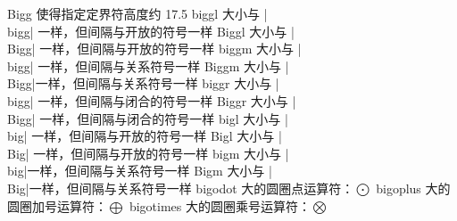 \capcs Bigg {使得指定定界符高度约 17.5\pt}{}{}
\capcs biggl {大小与 |\\bigg| 一样，但间隔与开放的符号一样}{}{}%
\capcs Biggl {大小与 |\\Bigg| 一样，但间隔与开放的符号一样}{}{}%
\capcs biggm {大小与 |\\bigg| 一样，但间隔与关系符号一样}{}{}%
\capcs Biggm {大小与 |\\Bigg|一样，但间隔与关系符号一样}{}{}%
\capcs biggr {大小与 |\\bigg| 一样，但间隔与闭合的符号一样}{}{}%
\capcs Biggr {大小与 |\\Bigg| 一样，但间隔与闭合的符号一样}{}{}%
\capcs bigl {大小与 |\\big| 一样，但间隔与开放的符号一样}{}{}%
\capcs Bigl {大小与 |\\Big| 一样，但间隔与开放的符号一样}{}{}%
\capcs bigm {大小与 |\\big|一样，但间隔与关系符号一样}{}{}%
\capcs Bigm {大小与 |\\Big|一样，但间隔与关系符号一样}{}{}%
\capcs bigodot {大的圆圈点运算符：$\bigodot$}{}{}%
\capcs bigoplus {大的圆圈加号运算符：$\bigoplus$}{}{}%
\capcs bigotimes {大的圆圈乘号运算符：$\bigotimes$}{}{}%
